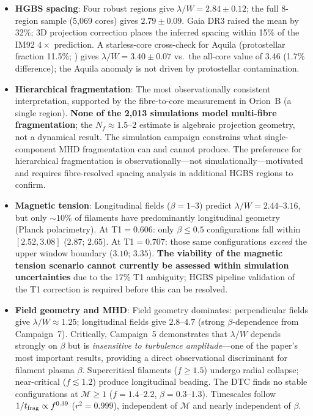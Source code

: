 \documentclass[twoside,twocolumn]{mnras}
\begin{document}
\begin{itemize}

    \item \textbf{HGBS spacing}: Four robust regions give $\lambda/W = 2.84 \pm 0.12$; the full 8-region sample (5,069 cores) gives $2.79 \pm 0.09$. Gaia DR3 raised the mean by 32\%; 3D projection correction places the inferred spacing within 15\% of the IM92 $4\times$ prediction. A starless-core cross-check for Aquila (protostellar fraction 11.5\%; \citealt{Konyves2015}) gives $\lambda/W = 3.40 \pm 0.07$ vs.\ the all-core value of 3.46 (1.7\% difference); the Aquila anomaly is not driven by protostellar contamination.

    \item \textbf{Hierarchical fragmentation}: The most observationally consistent
    interpretation, supported by the \citet{Yang2024} fibre-to-core measurement in
    Orion~B (a single region). \textbf{None of the 2,013 simulations model
    multi-fibre fragmentation}; the $N_f \approx 1.5$--$2$ estimate is algebraic
    projection geometry, not a dynamical result. The simulation campaign constrains
    what single-component MHD fragmentation can and cannot produce. The preference
    for hierarchical fragmentation is observationally---not simulationally---motivated
    and requires fibre-resolved spacing analysis in additional HGBS regions to confirm.

    \item \textbf{Magnetic tension}: Longitudinal fields ($\beta = 1$--$3$) predict
    $\lambda/W = 2.44$--$3.16$, but only ${\sim}10\%$ of filaments have
    predominantly longitudinal geometry (Planck polarimetry). At T1$=0.606$: only
    $\beta \leq 0.5$ configurations fall within $[2.52, 3.08]$ ($2.87$; $2.65$).
    At T1$=0.707$: those same configurations \textit{exceed} the upper window boundary
    ($3.10$; $3.35$). \textbf{The viability of the magnetic tension scenario cannot
    currently be assessed within simulation uncertainties} due to the 17\% T1
    ambiguity; HGBS pipeline validation of the T1 correction is required before
    this can be resolved.

    \item \textbf{Field geometry and MHD}: Field geometry dominates: perpendicular fields
    give $\lambda/W \approx 1.25$; longitudinal fields give $2.8$--$4.7$ (strong
    $\beta$-dependence from Campaign~7). Critically, Campaign~5 demonstrates that
    $\lambda/W$ depends strongly on $\beta$ but is \textit{insensitive to turbulence
    amplitude}---one of the paper's most important results, providing a direct
    observational discriminant for filament plasma $\beta$.
    Supercritical filaments ($f \geq 1.5$) undergo radial collapse;
    near-critical ($f \lesssim 1.2$) produce longitudinal beading. The DTC finds no
    stable configurations at $\mathcal{M} \geq 1$ ($f=1.4$--$2.2$, $\beta=0.3$--$1.3$).
    Timescales follow $1/t_{\rm frag} \propto f^{0.39}$ ($r^2 = 0.999$), independent of
    $\mathcal{M}$ and nearly independent of $\beta$.


\end{itemize}
\end{document}
